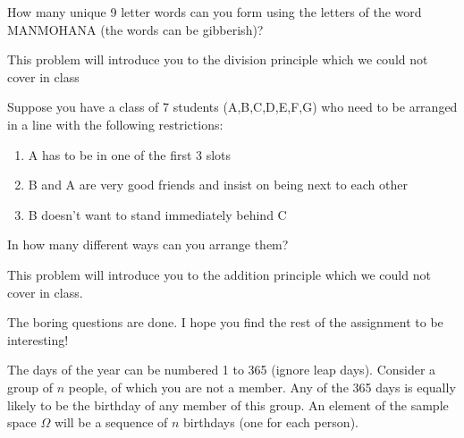 \documentclass[solution,addpoints,12pt]{exam}
\begin{document}
\begin{questions}
\begin{parts}
\begin{solution}
\end{solution}

\end{parts}
 
\question[\half] How many unique 9 letter words can you form using the letters of the word MANMOHANA (the words can be gibberish)?
\begin{solution}
This problem will introduce you to the division principle which we could not cover in class
\end{solution}

\question[\half] Suppose you have a class of 7 students (A,B,C,D,E,F,G) who need to be arranged in a line with the following restrictions: 
\begin{enumerate}
    \item A has to be in one of the first 3 slots
    \item B and A are very good friends and insist on being next to each other
    \item B doesn't want to stand immediately behind C
\end{enumerate}
In how many different ways can you arrange them?
\begin{solution}
This problem will introduce you to the addition principle which we could not cover in class.
\end{solution}

The boring questions are done. I hope you find the rest of the assignment to be interesting!


\question[3] The days of the year can be numbered 1 to 365 (ignore leap days). Consider a group of $n$ people, of which you are not a member. Any of the 365 days is equally likely to be the birthday of any member of this group. An element of the sample space $\Omega$ will be a sequence of $n$ birthdays (one for each person).

\end{questions}
\end{document}
